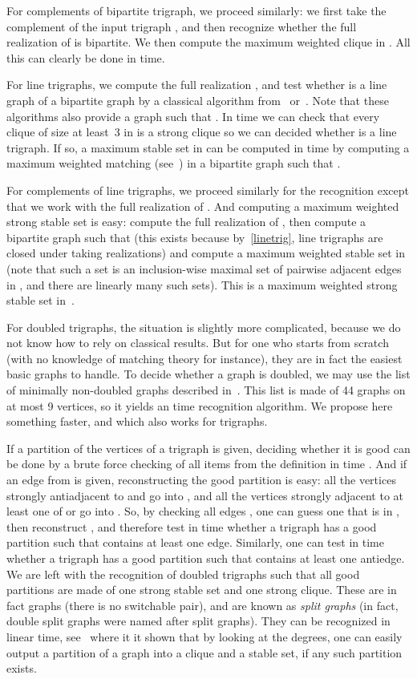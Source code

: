 \documentclass[11 pt] {article}
\begin{document}
For complements of bipartite trigraph, we proceed similarly: we first
take the complement  of the input trigraph , and then
recognize whether the full realization of  is
bipartite. We then compute the maximum weighted clique in
. All this can clearly be done in  time.

For line trigraphs, we compute the full realization , and test
whether  is a line graph of a bipartite graph by a classical
algorithm from~\cite{lehot:root} or~\cite{roussopoulos:linegraphe}.
Note that these algorithms also provide a graph  such that
.  In time  we can check that every clique of size at
least~3 in  is a strong clique so we can decided whether  is a
line trigraph.  If so, a maximum stable set in  can be computed in
time  by computing a maximum weighted matching
(see~\cite{schrijver:opticomb}) in a bipartite graph  such that .

For complements of line trigraphs, we proceed similarly for the
recognition except that we work with the full realization of .  And
computing a maximum weighted strong stable set is easy: compute the
full realization  of , then compute a bipartite graph  such
that  (this exists because by~\ref{linetrig},
line trigraphs are closed under taking realizations) and compute a
maximum weighted stable set in  (note that such a set is an
inclusion-wise maximal set of pairwise adjacent edges in , and there are
linearly many such sets).  This is a maximum weighted strong stable
set in~.

For doubled trigraphs, the situation is slightly more complicated,
because we do not know how to rely on classical results.  But for one
who starts from scratch (with no knowledge of matching theory for
instance), they are in fact the easiest basic graphs to handle.  To
decide whether a graph  is doubled, we may use the list of
minimally non-doubled graphs described in~\cite{alexeevFK:doubled}.
This list is made of 44 graphs on at most 9 vertices, so it yields an
 time recognition algorithm.  We propose here something
faster, and which also works for trigraphs.

If a partition  of the vertices of a trigraph is given,
deciding whether it is good can be done by a brute force checking of
all items from the definition in time .  And if an edge 
from  is given, reconstructing the good partition is easy: all
the vertices strongly antiadjacent to  and  go into , and all
the vertices strongly adjacent to at least one of  or  go into
.  So, by checking all edges , one can guess one that is in
, then reconstruct , and therefore test in time 
whether a trigraph  has a good partition  such that 
contains at least one edge.  Similarly, one can test in time 
whether a trigraph  has a good partition  such that 
contains at least one antiedge.  We are left with the recognition of
doubled trigraphs such that all good partitions are made of one strong
stable set and one strong clique.  These are in fact graphs (there is
no switchable pair), and are known as \emph{split graphs} (in fact,
double split graphs were named after split graphs).  They can be
recognized in linear time, see~\cite{hammerS:split} where it it shown
that by looking at the degrees, one can easily output a partition of a
graph into a clique and a stable set, if any such partition exists.
\end{document}
